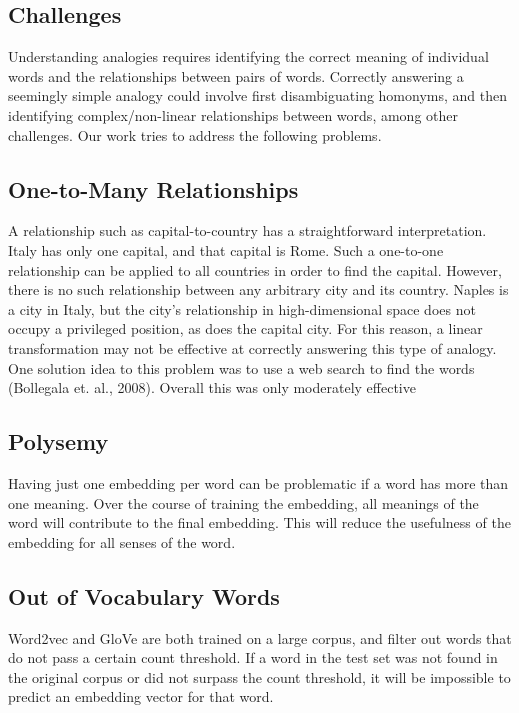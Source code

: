 \documentclass[11pt]{article}
\begin{document}
\subsection{Challenges}

Understanding analogies requires identifying the correct meaning of
individual words and the relationships between pairs of words. Correctly
answering a seemingly simple analogy could involve first disambiguating
homonyms, and then identifying complex/non-linear relationships between
words, among other challenges. Our work tries to address the following
problems.

\subsection{One-to-Many Relationships}

A relationship such as capital-to-country has a straightforward
interpretation. Italy has only one capital, and that capital is Rome.
Such a one-to-one relationship can be applied to all countries in order
to find the capital. However, there is no such relationship between any
arbitrary city and its country. Naples is a city in Italy, but the
city's relationship in high-dimensional space does not occupy a
privileged position, as does the capital city. For this reason, a linear
transformation may not be effective at correctly answering this type of
analogy. One solution idea to this problem was to use a web search to
find the words (Bollegala et. al., 2008). Overall this was only
moderately effective

\subsection{Polysemy}

Having just one embedding per word can be problematic if a word has more
than one meaning. Over the course of training the embedding, all
meanings of the word will contribute to the final embedding. This will
reduce the usefulness of the embedding for all senses of the word.

\subsection{Out of Vocabulary Words}

Word2vec and GloVe are both trained on a large corpus, and filter out
words that do not pass a certain count threshold. If a word in the test
set was not found in the original corpus or did not surpass the count
threshold, it will be impossible to predict an embedding vector for that
word.
\end{document}
